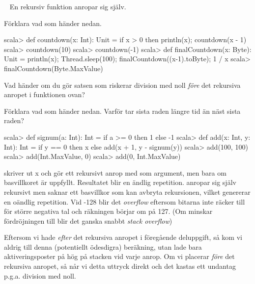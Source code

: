 \QUESTEND





\QUESTBEGIN

\Task\Uberkurs  \what~  En rekursiv funktion anropar sig själv.

\Subtask Förklara vad som händer nedan.

\begin{REPL}
scala> def countdown(x: Int): Unit = 
         if x > 0 then {println(x); countdown(x - 1)}
scala> countdown(10)
scala> countdown(-1)
scala> def finalCountdown(x: Byte): Unit =
         {println(x); Thread.sleep(100); finalCountdown((x-1).toByte); 1 / x}
scala> finalCountdown(Byte.MaxValue)
\end{REPL}

\Subtask Vad händer om du gör satsen som riskerar division med noll \emph{före} det rekursiva anropet i funktionen  ovan?

\Subtask Förklara vad som händer nedan. Varför tar sista raden längre tid än näst sista raden?
\begin{REPL}
scala> def signum(a: Int): Int = if a >= 0 then 1 else -1
scala> def add(x: Int, y: Int): Int =
         if y == 0 then x else add(x + 1, y - signum(y))
scala> add(100, 100)
scala> add(Int.MaxValue, 0)
scala> add(0, Int.MaxValue)
\end{REPL}

\SOLUTION

\TaskSolved \what

\SubtaskSolved
{} skriver ut x och gör ett rekursivt anrop med  som argument, men bara om basvillkoret  är uppfyllt. Resultatet blir en ändlig  repetition.
 anropar sig själv rekursivt men saknar ett basvillkor som kan avbryta rekursionen, vilket genererar en oändlig repetition. Vid -128 blir det \emph{overflow} eftersom bitarna inte räcker till för större negativa tal och räkningen börjar om på 127. (Om minskar fördröjningen till  blir det ganska snabbt \emph{stack overflow})

\SubtaskSolved
Eftersom vi hade  \emph{efter} det rekursiva anropet i föregående deluppgift, så kom vi aldrig till denna (potentiellt ödesdigra) beräkning, utan lade bara aktiveringsposter på hög på stacken vid varje anrop. Om vi placerar  \emph{före} det rekursiva anropet, så når vi detta uttryck direkt och det kastas ett undantag p.g.a. division med noll.

